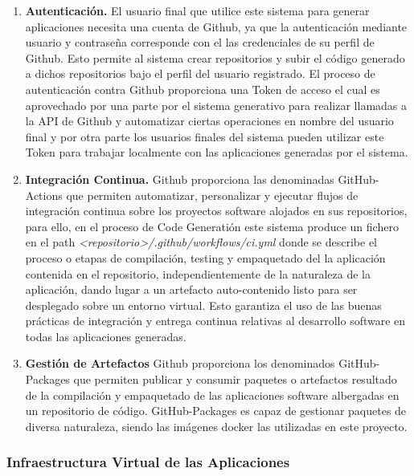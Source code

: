 \documentclass[a4paper,11pt]{book}
\begin{document}
\begin{enumerate}
\item \textbf{ Autenticación.} El usuario final que utilice este sistema para generar aplicaciones necesita una cuenta de Github, ya que la autenticación mediante usuario y contraseña corresponde con el las credenciales  de su perfil de Github. Esto permite al sistema crear repositorios y subir el código generado a dichos repositorios bajo el perfil del usuario registrado. El proceso de autenticación contra Github proporciona una Token  de acceso el cual es aprovechado por una parte por el sistema generativo para realizar llamadas a la API  de Github y automatizar ciertas operaciones en nombre del usuario final y por otra parte los usuarios finales del sistema  pueden utilizar este Token para trabajar localmente con las aplicaciones generadas por el sistema.

\item   \textbf{Integración Continua.} Github proporciona las denominadas GitHub-Actions\cite{github3}  que permiten automatizar, personalizar y ejecutar flujos de integración continua  sobre los proyectos software alojados en sus repositorios, para ello, en el proceso de Code Generatión este sistema produce un fichero  en el path  \textit{<repositorio>/.github/workflows/ci.yml} donde se describe el proceso o etapas de compilación, testing y empaquetado del la aplicación contenida en el repositorio, independientemente de la naturaleza de la aplicación, dando lugar a un artefacto auto-contenido listo para ser desplegado sobre un entorno virtual. Esto garantiza el uso de las buenas prácticas  de integración y entrega continua relativas al desarrollo software en todas las aplicaciones generadas. 

\item \textbf{Gestión de Artefactos} Github proporciona los denominados GitHub-Packages\cite{github4} que permiten publicar y consumir paquetes o artefactos resultado de la compilación y empaquetado de las aplicaciones software albergadas en un repositorio de código. GitHub-Packages es capaz de gestionar paquetes de diversa naturaleza, siendo las imágenes docker las utilizadas en este proyecto.
\end{enumerate}

\subsubsection{Infraestructura Virtual de las Aplicaciones}\label{infra}
\end{document}
